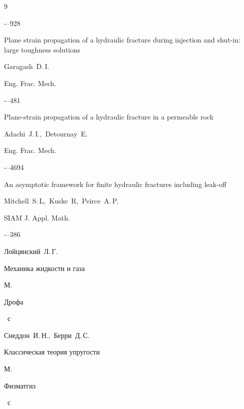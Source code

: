 \begin{thebibliography}{9}

-–928




\paper Plane strain propagation of a hydraulic fracture during injection and shut-in: large toughness solutions

\by   Garagash~D.\,I.

\jour Eng. Frac. Mech.



-–481




\paper Plane-strain propagation of a hydraulic fracture in a permeable rock

\by   Adachi~J.\,I.,~Detournay~E.

\jour Eng. Frac. Mech.



-–4694




\paper An asymptotic framework for finite hydraulic fractures including leak-off

\by   Mitchell~S.\,L,~Kuske~R,~Peirce~A.\,P.

\jour SIAM J. Appl. Math.



-–386




\by Лойцянский~Л.\,Г.

\book Механика жидкости и газа

\publaddr М.

\publ Дрофа


~с




\by Снеддон~И.\,Н.,~Берри~Д.\,С.

\book Классическая теория упругости

\publaddr М.

\publ Физматгиз


~с






\end{thebibliography}
